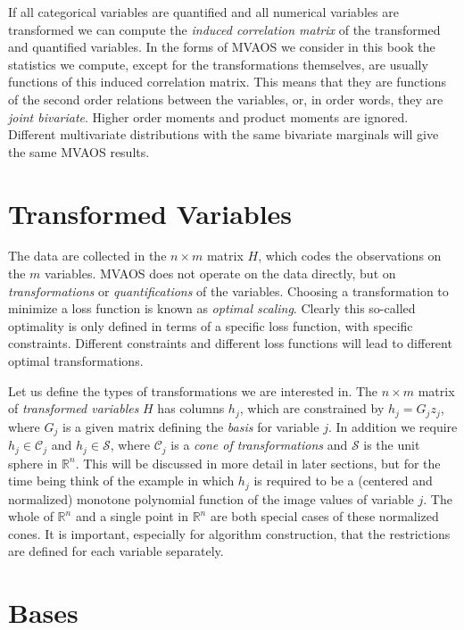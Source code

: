\documentclass[
  12pt,
  letterpaper,
  DIV=11,
  numbers=noendperiod]{scrreprt}
\begin{document}
If all categorical variables are quantified and all numerical variables
are transformed we can compute the \emph{induced correlation matrix} of
the transformed and quantified variables. In the forms of MVAOS we
consider in this book the statistics we compute, except for the
transformations themselves, are usually functions of this induced
correlation matrix. This means that they are functions of the second
order relations between the variables, or, in order words, they are
\emph{joint bivariate}. Higher order moments and product moments are
ignored. Different multivariate distributions with the same bivariate
marginals will give the same MVAOS results.

\section{Transformed Variables}\label{transformed-variables}

The data are collected in the \(n\times m\) matrix \(H\), which codes
the observations on the \(m\) variables. MVAOS does not operate on the
data directly, but on \emph{transformations} or \emph{quantifications}
of the variables. Choosing a transformation to minimize a loss function
is known as \emph{optimal scaling}. Clearly this so-called optimality is
only defined in terms of a specific loss function, with specific
constraints. Different constraints and different loss functions will
lead to different optimal transformations.

Let us define the types of transformations we are interested in. The
\(n\times m\) matrix of \emph{transformed variables} \(H\) has columns
\(h_j\), which are constrained by \(h_j=G_jz_j\), where \(G_j\) is a
given matrix defining the \emph{basis} for variable \(j\). In addition
we require \(h_j\in\mathcal{C}_j\) and \(h_j\in\mathcal{S}\), where
\(\mathcal{C}_j\) is a \emph{cone of transformations} and
\(\mathcal{S}\) is the unit sphere in \(\mathbb{R}^n\). This will be
discussed in more detail in later sections, but for the time being think
of the example in which \(h_j\) is required to be a (centered and
normalized) monotone polynomial function of the image values of variable
\(j\). The whole of \(\mathbb{R}^n\) and a single point in
\(\mathbb{R}^n\) are both special cases of these normalized cones. It is
important, especially for algorithm construction, that the restrictions
are defined for each variable separately.

\section{Bases}\label{bases}
\end{document}

